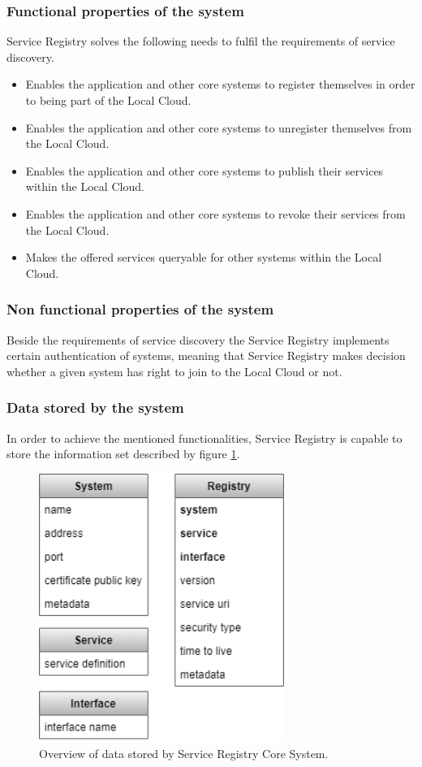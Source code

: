 \documentclass[a4paper]{arrowhead}
\begin{document}
\subsubsection {Functional properties of the system}
Service Registry solves the following needs to fulfil the requirements of service discovery.

\begin{itemize}
    \item Enables the application and other core systems to register themselves in order to being part of the Local Cloud.
    \item Enables the application and other core systems to unregister themselves from the Local Cloud.
    \item Enables the application and other core systems to publish their services within the Local Cloud.
    \item Enables the application and other core systems to revoke their services from the Local Cloud.
    \item Makes the offered services queryable for other systems within the Local Cloud.
\end{itemize}

\subsubsection {Non functional properties of the system}
Beside the requirements of service discovery the Service Registry implements certain authentication of systems, meaning that Service Registry makes decision whether a given system has right to join to the Local Cloud or not.

\subsubsection {Data stored by the system}
In order to achieve the mentioned functionalities, Service Registry is capable to store the information set described by figure \ref{fig:information_overview}.

\begin{figure}[h!]
  \centering
  \includegraphics[width=8cm]{figures/serviceregistry_data_overview.png}
  \caption{
    Overview of data stored by Service Registry Core System.
  }
  \label{fig:information_overview}
\end{figure}
\end{document}
